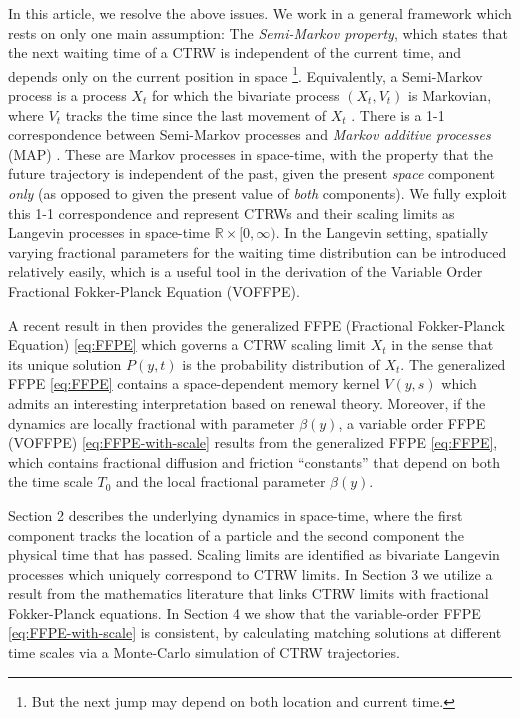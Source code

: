 \documentclass[a4paper,12pt]{elsarticle}
\numberwithin{equation}{section}
\theoremstyle{plain}
\theoremstyle{definition}
\theoremstyle{remark}
\numberwithin{equation}{section}
\newcommand{\spc}{\mathbb R}
\newcommand{\spctim}{\spc \times [0,\infty)}
\newcommand{\1}{\mathbf 1}
\begin{document}
In this article, we resolve the above issues. We work in a general 
framework which rests on only one main assumption: The 
\emph{Semi-Markov property}, which states that the next waiting time of a 
CTRW is independent of the current time, and depends only on the current 
position in space \cite{Germano2009}\footnote{But the next jump may depend
on both location and current time.}.
Equivalently, a Semi-Markov process is a process $X_t$ for which the 
bivariate process $(X_t, V_t)$ is Markovian, where $V_t$ tracks the time 
since the last movement of $X_t$ \cite{Meerschaert2014}. 
There is a 1-1 correspondence between Semi-Markov processes and 
\emph{Markov additive processes} (MAP) \cite{cinlar1974markov}.
These are Markov processes in space-time, with the property that
the future trajectory is independent of the past, given the present 
\emph{space} component \emph{only} (as opposed to given the present value 
of \emph{both} components). 
We fully exploit this 1-1 correspondence and 
represent CTRWs and their scaling limits as Langevin processes in 
space-time $\spctim$.
In the Langevin setting, spatially varying fractional parameters 
for the waiting time distribution can be introduced relatively easily, 
which is a useful tool in the derivation of the Variable Order Fractional 
Fokker-Planck Equation (VOFFPE).

A recent result in \cite{BaeumerStraka16} then provides the
generalized FFPE (Fractional Fokker-Planck Equation) \eqref{eq:FFPE}
which governs a CTRW scaling limit $X_t$ in the sense that its unique 
solution $P(y,t)$ is the probability distribution of $X_t$. 
The generalized FFPE \eqref{eq:FFPE} contains a 
space-dependent memory kernel $V(y,s)$ which admits an interesting 
interpretation
based on renewal theory.  Moreover, if the dynamics are locally fractional
with parameter $\beta(y)$, a variable order FFPE (VOFFPE) 
\eqref{eq:FFPE-with-scale} results from the generalized FFPE
\eqref{eq:FFPE}, which contains fractional diffusion and friction ``constants''
that depend on both the time scale $T_0$ and the local fractional parameter 
$\beta(y)$.

Section 2 describes the underlying dynamics in space-time, where the first
component tracks the location of a particle and the second component the
physical time that has passed.  Scaling limits are identified as bivariate
Langevin processes which uniquely correspond to CTRW limits.
In Section 3 we utilize a result from the mathematics literature that links CTRW 
limits with fractional Fokker-Planck equations.
In Section 4 we show that the variable-order FFPE \eqref{eq:FFPE-with-scale} is consistent, by  calculating matching solutions at different time scales via a Monte-Carlo simulation of CTRW trajectories.
\end{document}
